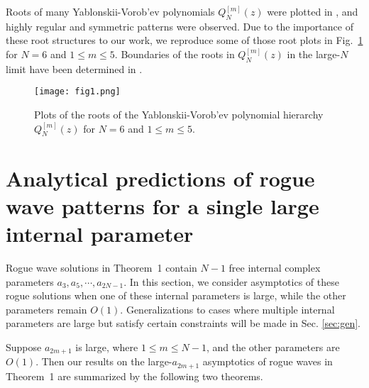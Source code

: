 \documentclass[amsmath,amssymb]{revtex4}
\begin{document}
Roots of many Yablonskii-Vorob'ev polynomials $Q_{N}^{[m]}(z)$ were plotted in \cite{Clarkson2003-II}, and
highly regular and symmetric patterns were observed. Due to the importance of these root structures to our work, we reproduce some of those root plots in Fig.~\ref{f:roots} for $N=6$ and $1\le m\le 5$. Boundaries of the roots in  $Q_{N}^{[m]}(z)$ in the large-$N$ limit have been determined in \cite{Miller2014,Bertola2016}.

\begin{figure}[htb]
\begin{center}
\texttt{[image: fig1.png]}
\caption{Plots of the roots of the Yablonskii-Vorob'ev polynomial hierarchy $Q_{N}^{[m]}(z)$ for $N=6$ and $1\le m\le 5$.  } \label{f:roots}
\end{center}
\end{figure}

\section{Analytical predictions of rogue wave patterns for a single large internal parameter}
Rogue wave solutions in Theorem~1 contain $N-1$ free internal complex parameters $a_3, a_5, \cdots, a_{2N-1}$. In this section, we consider asymptotics of these rogue solutions when one of these internal parameters is large, while the other parameters remain $O(1)$. Generalizations to cases where multiple internal parameters are large but satisfy certain constraints will be made in Sec. \ref{sec:gen}.

Suppose $a_{2m+1}$ is large, where $1\le m\le N-1$, and the other parameters are $O(1)$. Then our results on the large-$a_{2m+1}$ asymptotics of rogue waves in Theorem~1 are summarized by the following two theorems.
\end{document}
